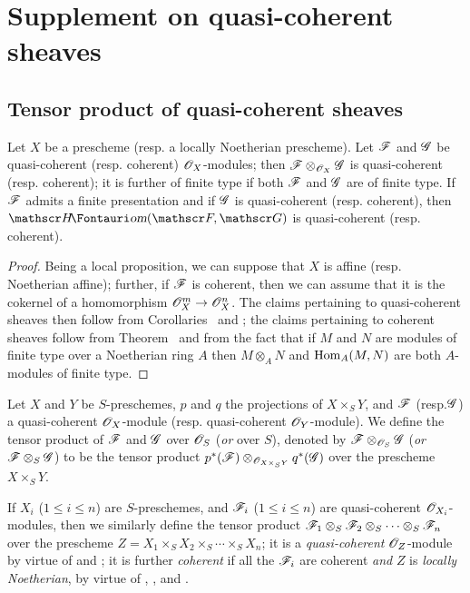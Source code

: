 \section{Supplement on quasi-coherent sheaves}
\label{section:1.9}

\subsection{Tensor product of quasi-coherent sheaves}
\label{subsection:1.9.1}

\begin{proposition}[9.1.1]
\label{1.9.1.1}
Let $X$ be a prescheme (resp. a locally Noetherian prescheme). Let $\mathscr{F}$ and
$\mathscr{G}$ be quasi-coherent (resp. coherent) $\mathscr{O}_X$-modules; then
$\mathscr{F}\otimes_{\mathscr{O}_X}\mathscr{G}$ is quasi-coherent (resp. coherent); it is further
of finite type if both $\mathscr{F}$ and $\mathscr{G}$ are of finite type. If
$\mathscr{F}$ admits a finite presentation and if $\mathscr{G}$ is quasi-coherent
(resp. coherent), then $\shHom(\sh{F},\sh{G})$ is quasi-coherent
(resp. coherent).
\end{proposition}

\begin{proof}
\label{proof-1.9.1.1}
Being a local proposition, we can suppose that $X$ is affine (resp. Noetherian
affine); further, if $\mathscr{F}$ is coherent, then we can assume that it is the
cokernel of a homomorphism $\sh{O}_X^m\to\sh{O}_X^n$. The claims pertaining to
quasi-coherent sheaves then follow from Corollaries~ and ; the
claims pertaining to coherent sheaves follow from Theorem~ and from the fact
that if $M$ and $N$ are modules of finite type over a Noetherian ring $A$
then $M\otimes_A N$ and $\operatorname{Hom}_A(M,N)$ are both $A$-modules of finite type.
\end{proof}

\begin{definition}[9.1.2]
\label{1.9.1.2}
Let $X$ and $Y$ be $S$-preschemes, $p$ and
$q$ the projections of $X\times_S Y$, and $\mathscr{F}$ (resp.$\mathscr{G}$) a
quasi-coherent $\mathscr{O}_X$-module (resp. quasi-coherent $\mathscr{O}_Y$-module). We define the
tensor product of $\mathscr{F}$ and $\mathscr{G}$ over $\mathscr{O}_S$ (\emph{or} over $S$),
denoted by $\mathscr{F}\otimes_{\mathscr{O}_S}\mathscr{G}$
(\emph{or} $\mathscr{F}\otimes_S\mathscr{G}$) to be the tensor product
$p^*(\mathscr{F})\otimes_{\mathscr{O}_{X\times_S Y}}q^*(\mathscr{G})$ over the prescheme $X\times_S Y$.
\end{definition}

If $X_i$ ($1\leq i\leq n$) are $S$-preschemes, and $\mathscr{F}_i$ ($1\leq i\leq n$) are quasi-coherent
$\mathscr{O}_{X_i}$-modules, then we similarly define the tensor product
$\mathscr{F}_1\otimes_S\mathscr{F}_2\otimes_S\cdots\otimes_S\mathscr{F}_n$ over the
prescheme $Z=X_1\times_S X_2\times_S\cdots\times_S X_n$; it is a
\emph{quasi-coherent} $\mathscr{O}_Z$-module by virtue of  and
; it is further \emph{coherent} if all the $\mathscr{F}_i$ are coherent \emph{and}
$Z$ is \emph{locally Noetherian}, by virtue of ,
, and .


